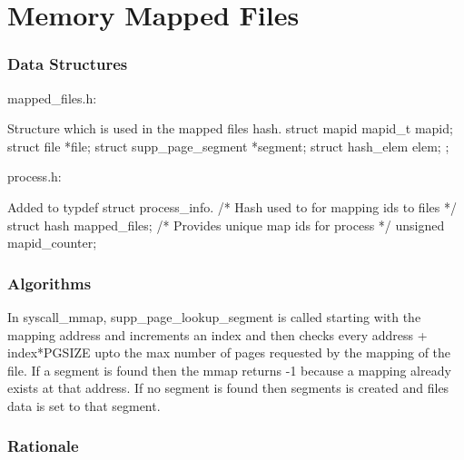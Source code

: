 \part{Memory Mapped Files}

\section{Data Structures}


mapped\_files.h:

Structure which is used in the mapped files hash.
struct mapid
  {
    mapid\_t mapid;
    struct file *file;
    struct supp\_page\_segment *segment;
    struct hash\_elem elem;
  };

process.h:

Added to typdef struct process\_info. 
  /* Hash used to for mapping ids to files */
  struct hash mapped\_files;
  /* Provides unique map ids for process */
  unsigned mapid\_counter;
  
\section{Algorithms}



In syscall\_mmap, supp\_page\_lookup\_segment is called starting with the mapping address and increments an index and then checks every address + index*PGSIZE upto the max number of pages requested by the mapping of the file. If a segment is found then the mmap returns -1 because a mapping already exists at that address. If no segment is found then segments is created and files data is set to that segment.


\section{Rationale}

